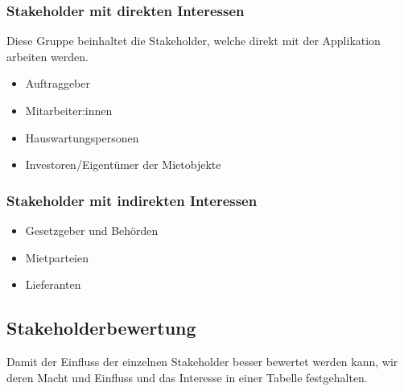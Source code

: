 \subsubsection{Stakeholder mit direkten Interessen}
Diese Gruppe beinhaltet die Stakeholder, welche direkt mit der Applikation arbeiten werden.

\begin{itemize}
  \item Auftraggeber
  \item Mitarbeiter:innen
  \item Hauswartungspersonen
  \item Investoren/Eigentümer der Mietobjekte
\end{itemize}

\subsubsection{Stakeholder mit indirekten Interessen}

\begin{itemize}
  \item Gesetzgeber und Behörden
  \item Mietparteien
  \item Lieferanten
\end{itemize}
\newpage
\subsection{Stakeholderbewertung}
Damit der Einfluss der einzelnen Stakeholder besser bewertet werden kann, wir deren Macht und Einfluss und das Interesse in einer Tabelle festgehalten.

